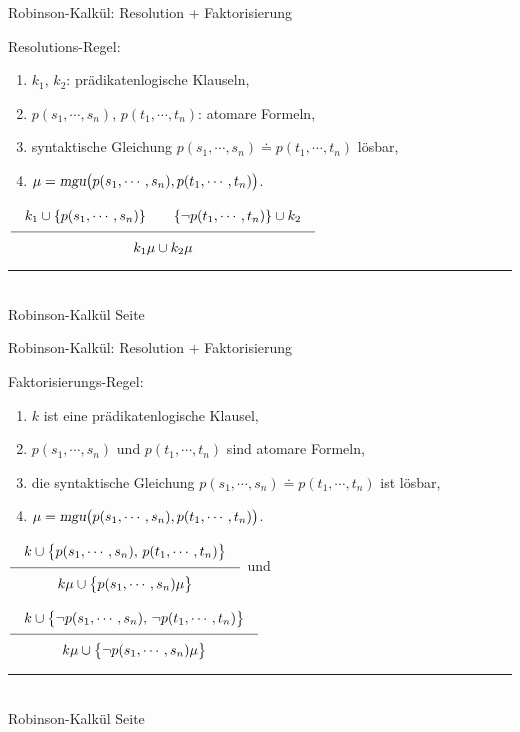 \documentclass{slides}
\newcommand{\myrule}{\rule{20cm}{1mm}\\ }
\newcommand{\schluss}[2]{\frac{\displaystyle\quad \rule[-8pt]{0pt}{18pt}#1 \quad}{\displaystyle\quad \rule{0pt}{14pt}#2 \quad}}
\newcounter{mypage}
\begin{document}

\begin{slide}{}
\normalsize
\begin{center}
Robinson-Kalk\"{u}l: Resolution + Faktorisierung
\end{center}
\vspace{0.5cm}

\footnotesize
Resolutions-Regel: 
\begin{enumerate}
\item $k_1$, $k_2$:  pr\"{a}dikatenlogische Klauseln,
\item $p(s_1,\cdots,s_n)$, $p(t_1,\cdots,t_n)$: atomare Formeln,
\item syntaktische Gleichung $p(s_1,\cdots,s_n)  \doteq p(t_1,\cdots,t_n)$ l\"{o}sbar, 
\item $\mu = \textsl{mgu}\bigl(p(s_1,\cdots,s_n), p(t_1,\cdots,t_n)\bigr)$.
\end{enumerate}
\hspace*{1.3cm} $\schluss{k_1 \cup\{ p(s_1,\cdots,s_n)\} \quad\quad \{\neg p(t_1,\cdots,t_n)\} \cup k_2}{k_1\mu \cup k_2\mu}$ 

\vspace*{\fill}
\tiny \addtocounter{mypage}{1}
\myrule
Robinson-Kalk\"{u}l \hspace*{\fill} Seite 
\end{slide}


\begin{slide}{}
\normalsize
\begin{center}
Robinson-Kalk\"{u}l: Resolution + Faktorisierung
\end{center}
\vspace{0.5cm}

\footnotesize
Faktorisierungs-Regel:
\begin{enumerate}
\item $k$ ist  eine pr\"{a}dikatenlogische Klausel,
\item $p(s_1,\cdots,s_n)$ und $p(t_1,\cdots,t_n)$ sind atomare Formeln,
\item die syntaktische Gleichung $p(s_1,\cdots,s_n)  \doteq p(t_1,\cdots,t_n)$ ist l\"{o}sbar, 
\item $\mu = \textsl{mgu}\bigl(p(s_1,\cdots,s_n), p(t_1,\cdots,t_n)\bigr)$.
\end{enumerate}
\hspace*{1.8cm}
$\schluss{k \cup \bigl\{p(s_1,\cdots,s_n),\, p(t_1,\cdots,t_n)\bigl\}}{k\mu \cup \bigl\{p(s_1,\cdots,s_n)\mu\bigr\} }$ 
\quad und 

\hspace*{1.8cm}
$\schluss{k \cup \bigl\{ \neg p(s_1,\cdots,s_n),\, \neg p(t_1,\cdots,t_n)\bigl\}}{k\mu \cup \bigl\{\neg p(s_1,\cdots,s_n)\mu\bigr\} }$ 



\vspace*{\fill}
\tiny \addtocounter{mypage}{1}
\myrule
Robinson-Kalk\"{u}l \hspace*{\fill} Seite 
\end{slide}
\end{document}
